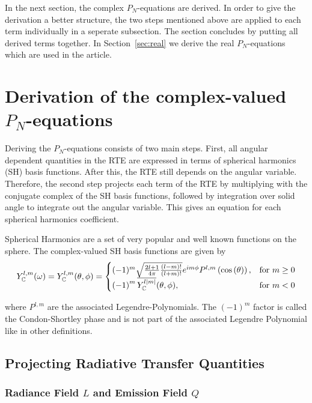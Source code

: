 \documentclass[10pt]{scrartcl}
\begin{document}
In the next section, the complex $P_N$-equations are derived. In order to give the derivation a better structure, the two steps mentioned above are applied to each term individually in a seperate subsection. The section concludes by putting all derived terms together. In Section~\ref{sec:real} we derive the real $P_N$-equations which are used in the article.

\section{Derivation of the complex-valued $P_N$-equations}

Deriving the $P_N$-equations consists of two main steps. First, all angular dependent quantities in the RTE are expressed in terms of spherical harmonics (SH) basis functions. After this, the RTE still depends on the angular variable. Therefore, the second step projects each term of the RTE by multiplying with the conjugate complex of the SH basis functions, followed by integration over solid angle to integrate out the angular variable. This gives an equation for each spherical harmonics coefficient.

Spherical Harmonics are a set of very popular and well known functions on the sphere. The complex-valued SH basis functions are given by
\begin{align}
Y_{\mathbb{C}}^{l,m}(\omega) = Y_{\mathbb{C}}^{l,m}(\theta, \phi)=
\begin{cases}
(-1)^m\sqrt{\frac{2l+1}{4\pi}\frac{(l-m)!}{(l+m)!}}e^{im\phi}P^{l,m}\left(\operatorname{cos}\left(\theta\right)\right), & \text{for $m\ge0$}\\
\left(-1\right)^m\overline{Y_{\mathbb{C}}^{l\left|m\right|}}(\theta, \phi), & \text{for $m<0$}
\end{cases}
\end{align}

where $P^{l,m}$ are the associated Legendre-Polynomials. The $\left(-1\right)^m$ factor is called the Condon-Shortley phase and is not part of the associated Legendre Polynomial like in other definitions.



\subsection{Projecting Radiative Transfer Quantities}

\subsubsection{Radiance Field $L$ and Emission Field $Q$}
\label{sec:complex_proj_L}
\end{document}
